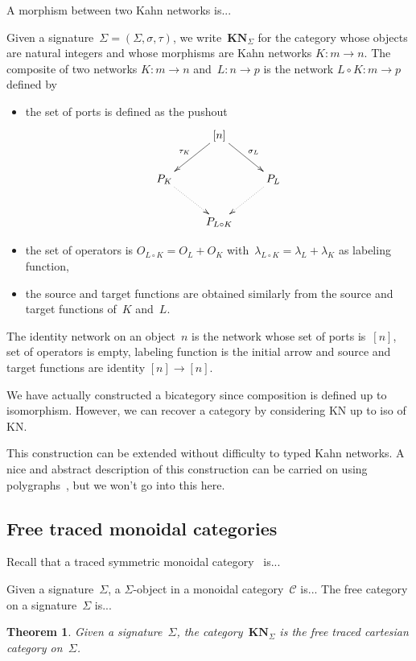 \documentclass{article}
\newtheorem{theorem}{Theorem}
\newcommand{\intset}[1]{[#1]}
\newcommand{\category}[1]{\mathbf{#1}}
\newcommand{\KN}{\category{KN}}
\renewcommand{\C}{\mathcal{C}}
\begin{document}
A morphism between two Kahn networks is...

Given a signature~$\Sigma=(\Sigma,\sigma,\tau)$, we write~$\KN_\Sigma$ for the
category whose objects are natural integers and whose morphisms are Kahn
networks \hbox{$K:m\to n$}. The composite of two networks $K:m\to n$ and~$L:n\to
p$ is the network $L\circ K:m\to p$ defined by
\begin{itemize}
\item the set of ports is defined as the pushout
  \[
  \xymatrix{
    &\ar[dl]_{\tau_K}\intset{n}\ar[dr]^{\sigma_L}&\\
    P_K\ar@{.>}[dr]&&\ar@{.>}[dl]P_L\\
    &P_{L\circ K}&\\
  }
  \]
\item the set of operators is $O_{L\circ K}=O_L+O_K$ with~$\lambda_{L\circ
    K}=\lambda_L+\lambda_K$ as labeling function,
\item the source and target functions are obtained similarly from the source and
  target functions of~$K$ and~$L$.
\end{itemize}
The identity network on an object~$n$ is the network whose set of ports
is~$\intset{n}$, set of operators is empty, labeling function is the initial
arrow and source and target functions are identity $\intset{n}\to\intset{n}$.

We have actually constructed a bicategory since composition is defined up to
isomorphism. However, we can recover a category by considering KN up to iso of
KN.

This construction can be extended without difficulty to typed Kahn networks. A
nice and abstract description of this construction can be carried on using
polygraphs~\cite{burroni1993higher}, but we won't go into this here.

\subsection{Free traced monoidal categories}
Recall that a traced symmetric monoidal
category~\cite{joyal-street-verity:traced-monoidal-categories} is...

Given a signature~$\Sigma$, a $\Sigma$-object in a monoidal category~$\C$
is... The free category on a signature~$\Sigma$ is...

\begin{theorem}
  Given a signature~$\Sigma$, the category~$\KN_\Sigma$ is the free traced
  cartesian category on~$\Sigma$.
\end{theorem}
\end{document}
